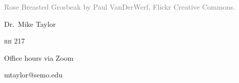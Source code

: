 \documentclass[t]{beamer}
\begin{document}


{
\begin{frame}[b,plain]
	\tiny\textcolor{gray}{Rose Breasted Grosbeak by Paul VanDerWerf, Flickr Creative Commons.}
\end{frame}
}

{
\begin{frame}[t]
	\large
	\vspace{2ex}
	\hangpara\hspace{15em} Dr.~Mike Taylor

	\hangpara\hspace{15em} \textsc{rh} 217
	
	\hangpara \hspace{15em} Office hours via Zoom


	\hangpara\hspace{15em} mtaylor@semo.edu
	

\end{frame}
}

\end{document}
